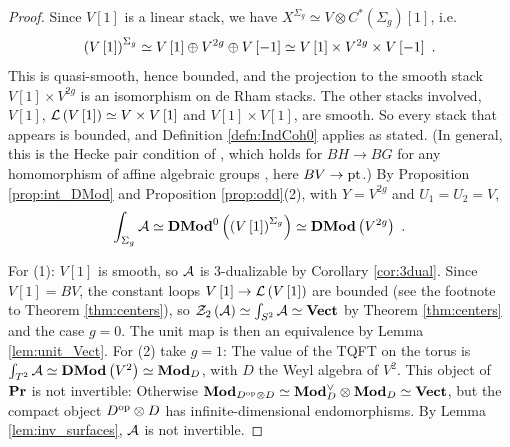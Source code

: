 \begin{proof}
Since $V\left[1\right]$ is a linear stack, we have
$X^{\Sigma_g}\simeq V\otimes C^*\left(\Sigma_g\right)\left[1\right]$, i.e.
\begin{equation*}
\left(V\left[1\right]\right)^{\Sigma_g}\simeq
V\left[1\right]\oplus V^{2g}\oplus V\left[-1\right]
\simeq V\left[1\right]\times V^{2g}\times V\left[-1\right] \ .
\end{equation*}
This is quasi-smooth, hence bounded, and the projection to the smooth stack $V\left[1\right]\times V^{2g}$ is an
isomorphism on de Rham stacks. The other stacks involved, $V\left[1\right]$,
$\mathcal{L}\left(V\left[1\right]\right)\simeq V\times V\left[1\right]$ and
$V\left[1\right]\times V\left[1\right]$, are smooth. So every stack that appears is bounded, and Definition
\ref{defn:IndCoh0} applies as stated. (In general, this is the Hecke pair condition of
\cite[Definition 3.4.2]{HoLi}, which holds for $BH\to BG$ for any homomorphism of affine
algebraic groups \cite[Lemma 3.4.4]{HoLi}, here $BV\to\text{pt}$.) By Proposition \ref{prop:int_DMod} and Proposition \ref{prop:odd}(2), with $Y=V^{2g}$ and
$U_1=U_2=V$,
\begin{equation*}
\int_{\Sigma_g}\mathcal{A}\simeq\mathbf{DMod}^0\left(\left(V\left[1\right]\right)^{\Sigma_g}\right)
\simeq\mathbf{DMod}\left(V^{2g}\right) \ .
\end{equation*}

For (1): $V\left[1\right]$ is smooth, so $\mathcal{A}$ is $3$-dualizable by Corollary \ref{cor:3dual}.
Since $V\left[1\right]=BV$, the constant loops $V\left[1\right]\to\mathcal{L}\left(V\left[1\right]\right)$
are bounded (see the footnote to Theorem \ref{thm:centers}), so
$\mathcal{Z}_2\left(\mathcal{A}\right)\simeq\int_{S^2}\mathcal{A}\simeq\mathbf{Vect}$ by Theorem \ref{thm:centers} and the
case $g=0$. The unit map is then an equivalence by Lemma \ref{lem:unit_Vect}.
For (2) take $g=1$: The value of the TQFT on the torus is
$\int_{T^2}\mathcal{A}\simeq\mathbf{DMod}\left(V^2\right)\simeq\mathbf{Mod}_D$, with $D$ the Weyl algebra
of $V^2$. This object of $\mathbf{Pr}$ is not invertible: Otherwise
$\mathbf{Mod}_{D^{\text{op}}\otimes D}\simeq\mathbf{Mod}_D^\vee\otimes\mathbf{Mod}_D\simeq\mathbf{Vect}$, but the compact object
$D^{\text{op}}\otimes D$ has infinite-dimensional endomorphisms. By Lemma
\ref{lem:inv_surfaces}, $\mathcal{A}$ is not invertible.


\end{proof}
